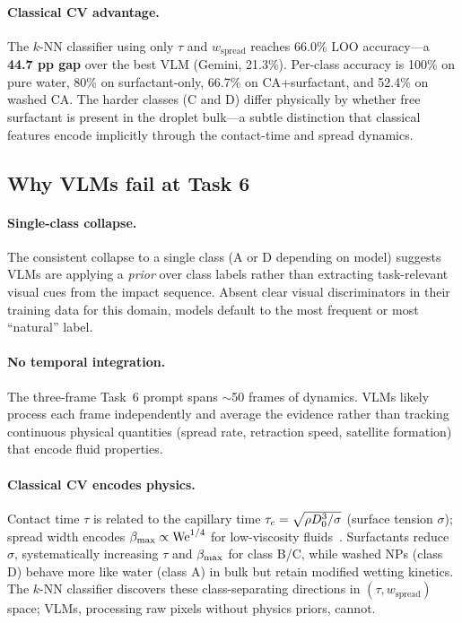 \documentclass[10pt,twocolumn,letterpaper]{article}
\begin{document}
\paragraph{Classical CV advantage.}
The $k$-NN classifier using only $\tau$ and $w_{\text{spread}}$ reaches
66.0\% LOO accuracy—a \textbf{44.7 pp gap} over the best VLM (Gemini, 21.3\%).
Per-class accuracy is 100\% on pure water, 80\% on surfactant-only, 66.7\% on
CA+surfactant, and 52.4\% on washed CA.
The harder classes (C and D) differ physically by whether free surfactant is
present in the droplet bulk—a subtle distinction that classical features
encode implicitly through the contact-time and spread dynamics.

\subsection{Why VLMs fail at Task 6}

\paragraph{Single-class collapse.}
The consistent collapse to a single class (A or D depending on model)
suggests VLMs are applying a \emph{prior} over class labels rather than
extracting task-relevant visual cues from the impact sequence.
Absent clear visual discriminators in their training data for this domain,
models default to the most frequent or most ``natural'' label.

\paragraph{No temporal integration.}
The three-frame Task~6 prompt spans $\sim$50 frames of dynamics.
VLMs likely process each frame independently and average the evidence
rather than tracking continuous physical quantities (spread rate, retraction
speed, satellite formation) that encode fluid properties.

\paragraph{Classical CV encodes physics.}
Contact time $\tau$ is related to the capillary time
$\tau_c = \sqrt{\rho D_0^3 / \sigma}$ (surface tension $\sigma$);
spread width encodes $\beta_{\max} \propto \mathrm{We}^{1/4}$ for low-viscosity
fluids~\cite{yarin2006drop}.
Surfactants reduce $\sigma$, systematically increasing $\tau$ and
$\beta_{\max}$ for class B/C, while washed NPs (class D) behave more like
water (class A) in bulk but retain modified wetting kinetics.
The $k$-NN classifier discovers these class-separating directions in
$(\tau, w_{\text{spread}})$ space; VLMs, processing raw pixels without
physics priors, cannot.
\end{document}

